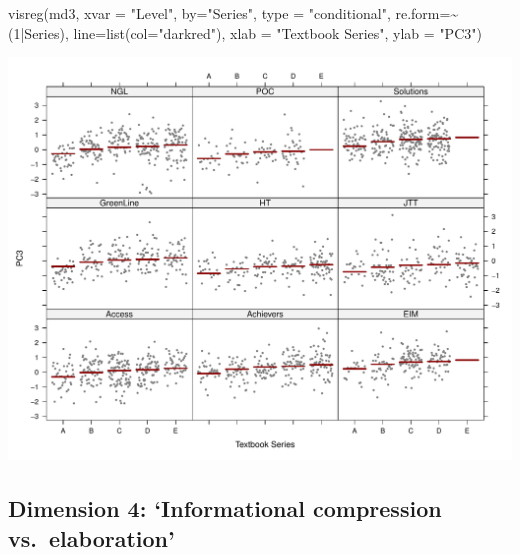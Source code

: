 \documentclass[
  letterpaper,
  DIV=11,
  numbers=noendperiod]{scrreprt}
\newenvironment{Shaded}{\begin{snugshade}}{\end{snugshade}}
\newcommand{\AttributeTok}[1]{\textcolor[rgb]{0.40,0.45,0.13}{#1}}
\newcommand{\DecValTok}[1]{\textcolor[rgb]{0.68,0.00,0.00}{#1}}
\newcommand{\FunctionTok}[1]{\textcolor[rgb]{0.28,0.35,0.67}{#1}}
\newcommand{\NormalTok}[1]{\textcolor[rgb]{0.00,0.23,0.31}{#1}}
\newcommand{\SpecialCharTok}[1]{\textcolor[rgb]{0.37,0.37,0.37}{#1}}
\newcommand{\StringTok}[1]{\textcolor[rgb]{0.13,0.47,0.30}{#1}}
\begin{document}
\begin{Shaded}
\begin{Highlighting}[]
\FunctionTok{visreg}\NormalTok{(md3, }\AttributeTok{xvar =} \StringTok{"Level"}\NormalTok{, }\AttributeTok{by=}\StringTok{"Series"}\NormalTok{, }\AttributeTok{type =} \StringTok{"conditional"}\NormalTok{, }\AttributeTok{re.form=}\SpecialCharTok{\textasciitilde{}}\NormalTok{(}\DecValTok{1}\SpecialCharTok{|}\NormalTok{Series), }
       \AttributeTok{line=}\FunctionTok{list}\NormalTok{(}\AttributeTok{col=}\StringTok{"darkred"}\NormalTok{), }\AttributeTok{xlab =} \StringTok{"Textbook Series"}\NormalTok{, }\AttributeTok{ylab =} \StringTok{"PC3"}\NormalTok{)}
\end{Highlighting}
\end{Shaded}

\includegraphics{AppendixF_files/figure-pdf/Dim3comparisons-3.pdf}

\subsection{Dimension 4: `Informational compression
vs.~elaboration'}\label{dimension-4-informational-compression-vs.-elaboration}
\end{document}
